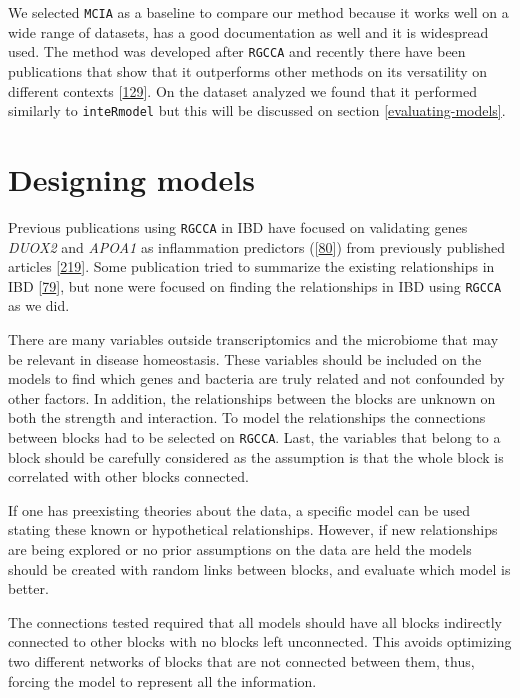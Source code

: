\documentclass[
  12pt,
  a4paper,
  twoside,
  openright]{book}
\begin{document}
We selected \texttt{MCIA} as a baseline to compare our method because it works well on a wide range of datasets, has a good documentation as well and it is widespread used.
The method was developed after \texttt{RGCCA} and recently there have been publications that show that it outperforms other methods on its versatility on different contexts {[}\protect\hyperlink{ref-cantini2021}{129}{]}.
On the dataset analyzed we found that it performed similarly to \texttt{inteRmodel} but this will be discussed on section \ref{evaluating-models}.

\hypertarget{designing-models}{%
\section{Designing models}\label{designing-models}}

Previous publications using \texttt{RGCCA} in IBD have focused on validating genes \emph{DUOX2} and \emph{APOA1} as inflammation predictors ({[}\protect\hyperlink{ref-tang2017}{80}{]}) from previously published articles {[}\protect\hyperlink{ref-haberman2014}{219}{]}.
Some publication tried to summarize the existing relationships in IBD {[}\protect\hyperlink{ref-hasler_uncoupling_2016}{79}{]}, but none were focused on finding the relationships in IBD using \texttt{RGCCA} as we did.

There are many variables outside transcriptomics and the microbiome that may be relevant in disease homeostasis.
These variables should be included on the models to find which genes and bacteria are truly related and not confounded by other factors.
In addition, the relationships between the blocks are unknown on both the strength and interaction.
To model the relationships the connections between blocks had to be selected on \texttt{RGCCA}.
Last, the variables that belong to a block should be carefully considered as the assumption is that the whole block is correlated with other blocks connected.

If one has preexisting theories about the data, a specific model can be used stating these known or hypothetical relationships.
However, if new relationships are being explored or no prior assumptions on the data are held the models should be created with random links between blocks, and evaluate which model is better.

The connections tested required that all models should have all blocks indirectly connected to other blocks with no blocks left unconnected.
This avoids optimizing two different networks of blocks that are not connected between them, thus, forcing the model to represent all the information.
\end{document}
